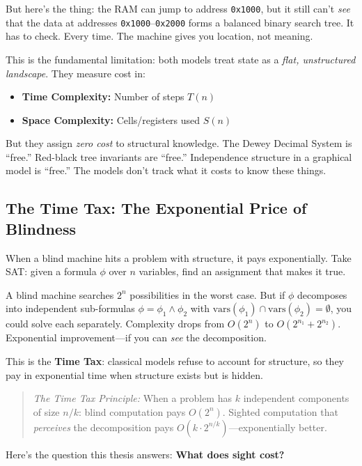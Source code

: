 But here's the thing: the RAM can jump to address \texttt{0x1000}, but it still can't \textit{see} that the data at addresses \texttt{0x1000}--\texttt{0x2000} forms a balanced binary search tree. It has to check. Every time. The machine gives you location, not meaning.

This is the fundamental limitation: both models treat state as a \textit{flat, unstructured landscape}. They measure cost in:
\begin{itemize}
    \item \textbf{Time Complexity:} Number of steps $T(n)$
    \item \textbf{Space Complexity:} Cells/registers used $S(n)$
\end{itemize}

But they assign \textit{zero cost} to structural knowledge. The Dewey Decimal System is ``free.'' Red-black tree invariants are ``free.'' Independence structure in a graphical model is ``free.'' The models don't track what it costs to know these things.

\subsection{The Time Tax: The Exponential Price of Blindness}

When a blind machine hits a problem with structure, it pays exponentially. Take SAT: given a formula $\phi$ over $n$ variables, find an assignment that makes it true.

A blind machine searches $2^n$ possibilities in the worst case. But if $\phi$ decomposes into independent sub-formulas $\phi = \phi_1 \land \phi_2$ with $\text{vars}(\phi_1) \cap \text{vars}(\phi_2) = \emptyset$, you could solve each separately. Complexity drops from $O(2^n)$ to $O(2^{n_1} + 2^{n_2})$. Exponential improvement---if you can \emph{see} the decomposition.

This is the \textbf{Time Tax}: classical models refuse to account for structure, so they pay in exponential time when structure exists but is hidden.

\begin{quote}
    \textit{The Time Tax Principle:} When a problem has $k$ independent components of size $n/k$: blind computation pays $O(2^n)$. Sighted computation that \textit{perceives} the decomposition pays $O(k \cdot 2^{n/k})$---exponentially better.
\end{quote}

Here's the question this thesis answers: \textbf{What does sight cost?}

